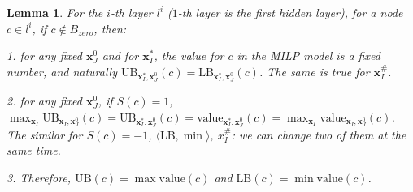 \documentclass[]{article}
\newtheorem{lemma}{Lemma}
\theoremstyle{definition}
\newcommand{\Val}{\mathrm{value}}
\newcommand{\UB}{\mathrm{UB}}
\newcommand{\LB}{\mathrm{LB}}
\begin{document}
\begin{lemma}
	For the $i$-th layer $l^i$ ($1$-th layer is the first hidden layer), for a node $c\in l^i$, if $c\notin B_{zero}$, then:
	
	\vspace*{1ex}
	
	1. for any fixed $\boldsymbol{x}^0_J$ and for $\boldsymbol{x}^*_I$, the value for $c$ in the MILP model is a fixed number, and naturally $\UB_{\boldsymbol{x}^*_I,\boldsymbol{x}^0_J}(c)=\LB_{\boldsymbol{x}^*_I,\boldsymbol{x}^0_J}(c)$. The same is true for $\boldsymbol{x}^\#_I$.
	
	\vspace*{1ex}
	
	2. for any fixed $\boldsymbol{x}^0_J$, if $S(c)=1$,  $\max_{\boldsymbol{x}_I} \UB_{\boldsymbol{x}_I,\boldsymbol{x}^0_J}(c)=\UB_{\boldsymbol{x}^*_I,\boldsymbol{x}^0_J}(c)= \Val_{\boldsymbol{x}^*_I,\boldsymbol{x}^0_J}(c) = \max_{\boldsymbol{x}_I} \Val_{\boldsymbol{x}_I,\boldsymbol{x}^0_J}(c)$. The similar for $S(c)=-1$, $\langle \LB,\min\rangle$, $x^\#_I$: we can change two of them at the same time.
	
	\vspace*{1ex}
	
	3. Therefore, $\UB(c)=\max\Val(c)$ and $\LB(c)=\min\Val(c)$.
	
	
\end{lemma}
\end{document}
